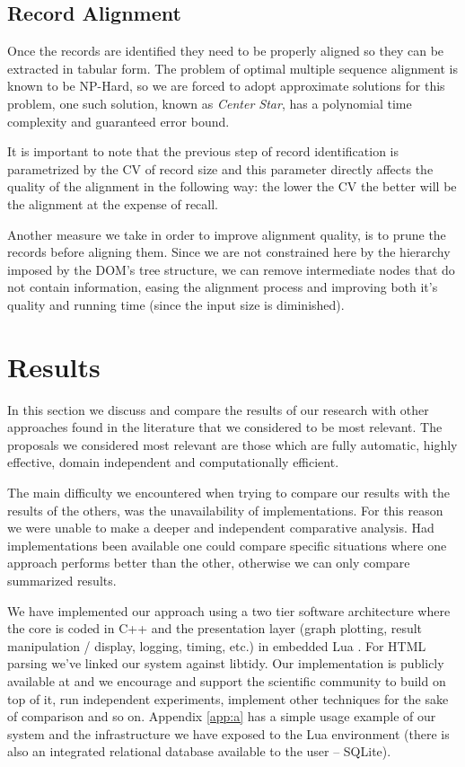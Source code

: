 \documentclass{vldb}
\begin{document}
\subsection{Record Alignment}\label{ss:reca}

Once the records are identified they need to be properly aligned so they can be
extracted in tabular form. The problem of optimal multiple sequence alignment is
known to be NP-Hard\cite{msanphard2006}, so we are forced to adopt approximate
solutions for this problem, one such solution, known as \textit{Center
Star}\cite{centerstar1993}, has a polynomial time complexity and guaranteed
error bound.

It is important to note that the previous step of record identification is
parametrized by the CV of record size and this parameter directly affects the
quality of the alignment in the following way: the lower the CV the better will
be the alignment at the expense of recall.

Another measure we take in order to improve alignment quality, is to prune the
records before aligning them. Since we are not constrained here by the hierarchy
imposed by the DOM's tree structure, we can remove intermediate nodes that do
not contain information, easing the alignment process and improving both it's
quality and running time (since the input size is diminished).

\section{Results}\label{sec:result}

In this section we discuss and compare the results of our research with other
approaches found in the literature that we considered to be most relevant. The
proposals we considered most relevant are those which are fully automatic,
highly effective, domain independent and computationally efficient.

The main difficulty we encountered when trying to compare our results with the
results of the others, was the unavailability of implementations. For this
reason we were unable to make a deeper and independent comparative analysis.
Had implementations been available one could compare specific situations where
one approach performs better than the other, otherwise we can only compare
summarized results. 

We have implemented our approach using a two tier software architecture where
the core is coded in C++ and the presentation layer (graph plotting, result
manipulation / display, logging, timing, etc.) in embedded Lua \cite{luahome}.
For HTML parsing we've linked our system against libtidy\cite{libtidy}. Our
implementation is publicly available at \cite{} and we encourage and support the
scientific community to build on top of it, run independent experiments,
implement other techniques for the sake of comparison and so on. Appendix
\ref{app:a} has a simple usage example of our system and the infrastructure we
have exposed to the Lua environment (there is also an integrated relational database
available to the user -- SQLite\cite{sqlite}).
\end{document}
